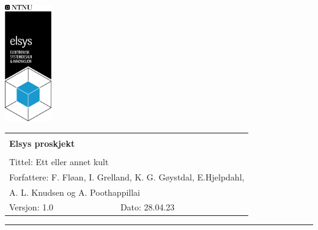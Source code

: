 
\begin{minipage}[c]{0.15\textwidth}
\includegraphics[width=2.0cm]{Images/elsys_pos_staaende_ntnu.png}  
\end{minipage}
\begin{minipage}[c]{0.85\textwidth}
\renewcommand{\arraystretch}{1.7}
\large 
\begin{tabularx}{\textwidth}{|X|X|}
\hline
\multicolumn{2}{|l|}{} \\
\multicolumn{2}{|l|}{\huge \textbf{Elsys proskjekt}} \\
\multicolumn{2}{|l|}{}  \\
\hline
\multicolumn{2}{|l|}{Tittel: 
Ett eller annet kult
} \\
\hline
\multicolumn{2}{|l|}{Forfattere: 
F. Fløan, I. Grelland, K. G. Gøystdal, E.Hjelpdahl, 


} \\
\multicolumn{2}{|l|}{A. L. Knudsen og A. Poothappillai}  \\
\hline

Versjon: 1.0 & Dato: 28.04.23
\\
\hline 
\end{tabularx}
\end{minipage}
\normalsize


\newpage
\setlength{\parskip}{0ex}
\renewcommand{\baselinestretch}{0.1}\normalsize
\tableofcontents
\renewcommand{\baselinestretch}{1.00}\normalsize
\setlength{\parskip}{2ex}
\rule{\textwidth}{1pt}